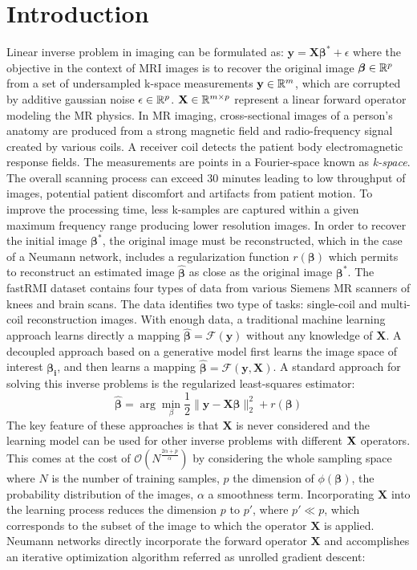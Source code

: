 \documentclass[12pt,twoside]{article}
\begin{document}
\section*{Introduction}
Linear inverse problem in imaging can be formulated as: $\textbf{y} = \mathbf{X} \bm{\beta^*} + \epsilon$ where the objective in the context of MRI images is to recover the original image
$\bm{\beta} \in \mathbb{R}^p$ from a set of undersampled k-space measurements  $\textbf{y} \in \mathbb{R}^m$,  which are corrupted by additive gaussian noise $\epsilon \in \mathbb{R}^p$.
$ \mathbf{X} \in \mathbb{R}^{m \times p}$ represent a linear forward operator modeling the MR physics. In MR imaging, cross-sectional images of a person's anatomy are produced
from a strong magnetic field and radio-frequency signal created by various coils. A receiver coil detects the patient body electromagnetic response fields. The measurements are points in
a Fourier-space known as  \emph{k-space}. The overall scanning process can exceed $30$ minutes leading to low throughput of images, potential patient discomfort and artifacts
from patient motion. To improve the processing time, less k-samples are captured within a given maximum frequency range producing lower resolution images. In order to recover the initial
image $\bm{\beta^*}$, the original image must be reconstructed, which in the case of a Neumann network, includes a regularization  function $r(\bm{\beta})$ 
which permits to reconstruct an estimated image $\hat{\bm{\beta}}$ 
as close as the original image $\bm{\beta^*}$. The fastRMI dataset contains four types of data from various Siemens MR scanners of knees and brain scans. The data identifies two type of tasks:
 single-coil  and multi-coil reconstruction images. With enough data, a traditional machine learning approach learns directly a mapping $\bm{\hat{\beta}} = \mathcal{F}(\textbf{y})$ without any knowledge of $\mathbf{X}$.
 A decoupled approach based on a generative model first learns the image space of interest $\bm{\beta_i}$, and then learns a mapping $\bm{\hat{\beta}} = \mathcal{F}(\textbf{y}, \mathbf{X})$.
 A standard approach for solving this inverse problems is the regularized least-squares estimator:
 $$ \bm{\hat{\beta}} = \arg \min_{\beta} \frac{1}{2} \| \textbf{y} - \mathbf{X} \bm{\beta} \|_2^2 + r(\bm{\beta})$$
 The key feature of these approaches is that $ \mathbf{X}$ is never considered and the learning model can be used for other inverse problems with different ${\mathbf X}$ operators.
 This comes at the cost of $\mathcal{O}(N^{ \frac{2 \alpha + p} {\alpha} })$ by considering the whole sampling space
  where $N$ is the number of training samples, $p$ the dimension of $\phi(\bm{\beta})$, the probability distribution of the images, $\alpha$ a smoothness term.
  Incorporating $\mathbf{X}$ into the learning process reduces the dimension $p$ to $p'$, where $p' \ll p$, which corresponds to the subset of the image to which the operator $\mathbf{X}$ is applied.
  Neumann networks directly incorporate the forward operator $\mathbf{X}$ and accomplishes an iterative optimization algorithm referred as unrolled gradient descent:
  
\end{document}
